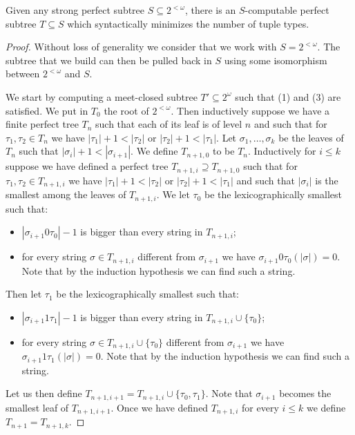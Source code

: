 \begin{lemma} \label{lem:existance_smntt}
Given any strong perfect subtree $S \subseteq 2^{<\omega}$, there is an $S$-computable perfect subtree $T \subseteq S$ which syntactically minimizes the number of tuple types.
\end{lemma}
\begin{proof}
Without loss of generality we consider that we work with $S = 2^{<\omega}$. The subtree that we build can then be pulled back in $S$ using some isomorphism between $2^{<\omega}$ and $S$.

We start by computing a meet-closed subtree $T' \subseteq 2^{\omega}$ such that (1) and (3) are satisfied. We put in $T_{0}$ the root of $2^{<\omega}$. Then inductively suppose we have a finite perfect tree $T_n$ such that each of its leaf is of level $n$ and such that for $\tau_1,\tau_2 \in T_{n}$ we have $|\tau_1| +1 < |\tau_2|$ or $|\tau_2| +1 < |\tau_1|$. Let $\sigma_1, \dots, \sigma_k$ be the leaves of $T_n$ such that $|\sigma_i|+1 < |\sigma_{i+1}|$. We define $T_{n+1, 0}$ to be $T_{n}$. Inductively for $i \leq k$ suppose we have defined a perfect tree $T_{n+1, i} \supseteq T_{n+1,0}$ such that for $\tau_1,\tau_2 \in T_{n+1, i}$ we have $|\tau_1| +1 < |\tau_2|$ or $|\tau_2| +1 < |\tau_1|$ and such that $|\sigma_i|$ is the smallest among the leaves of $T_{n+1, i}$. We let $\tau_0$ be the lexicographically smallest such that:

\begin{itemize}
\item $|\sigma_{i+1}0\tau_0| - 1$ is bigger than every string in $T_{n+1, i}$;
\item for every string $\sigma \in T_{n+1, i}$ different from $\sigma_{i+1}$ we have $\sigma_{i+1}0\tau_0(|\sigma|) = 0$. Note that by the induction hypothesis we can find such a string.
\end{itemize}
Then let $\tau_1$ be the lexicographically smallest such that:
\begin{itemize}
\item $|\sigma_{i+1}1\tau_1| - 1$ is bigger than every string in $T_{n+1, i} \cup \{\tau_0\}$;
\item for every string $\sigma \in T_{n+1, i} \cup \{\tau_0\}$ different from $\sigma_{i+1}$ we have $\sigma_{i+1}1\tau_1(|\sigma|) = 0$. Note that by the induction hypothesis we can find such a string.
\end{itemize}

Let us then define $T_{n+1, i+1} = T_{n+1, i} \cup \{\tau_0, \tau_1\}$. Note that $\sigma_{i+1}$ becomes the smallest leaf of $T_{n+1, i+1}$. Once we have defined $T_{n+1, i}$ for every $i \leq k$ we define $T_{n+1} = T_{n+1, k}$.


\end{proof}
